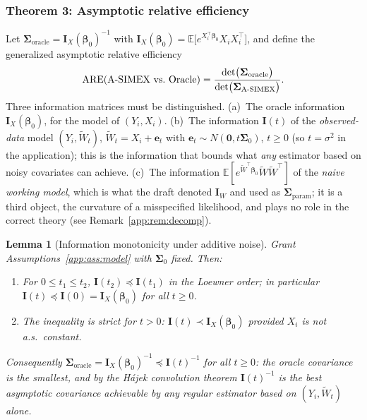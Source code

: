 \documentclass[11pt]{article}
\theoremstyle{plain}
\newtheorem{lemma}{Lemma}
\theoremstyle{definition}
\newcommand{\E}{\mathbb{E}}
\newcommand{\bet}{\bm{\beta}}
\newcommand{\bSig}{\bm{\Sigma}}
\newcommand{\asimex}{\textup{A-SIMEX}}
\begin{document}
\subsubsection{Theorem 3: Asymptotic relative efficiency}\label{app:sec:are}

Let $\bSig_{\mathrm{oracle}}=\bm I_X(\bet_0)^{-1}$ with
$\bm I_X(\bet_0)=\E\bigl[e^{X_i^\top\bet_0}X_iX_i^\top\bigr]$, and define
the generalized asymptotic relative efficiency
\[
  \mathrm{ARE}(\asimex\text{ vs.\ Oracle})
  =\frac{\det\bigl(\bSig_{\mathrm{oracle}}\bigr)}
        {\det\bigl(\bSig_{\asimex}\bigr)} .
\]
Three information matrices must be distinguished. (a)~The oracle
information $\bm I_X(\bet_0)$, for the model of $(Y_i,X_i)$. (b)~The
information $\bm I(t)$ of the \emph{observed-data} model
$(Y_i,\widetilde W_t)$, $\widetilde W_t=X_i+\bm e_t$ with
$\bm e_t\sim N(\bm 0,t\bSig_0)$, $t\ge0$ (so $t=\sigma^2$ in the
application); this is the information that bounds what \emph{any}
estimator based on noisy covariates can achieve. (c)~The information
$\E[e^{\widetilde W^\top\bet_0}\widetilde W\widetilde W^\top]$ of the
\emph{naive working model}, which is what the draft denoted
$\bm I_W$ and used as $\bSig_{\mathrm{param}}$; it is a third object,
the curvature of a misspecified likelihood, and plays no role in the
correct theory (see Remark~\ref{app:rem:decomp}).

\begin{lemma}[Information monotonicity under additive noise]\label{app:lem:info}
Grant Assumptions~\ref{app:ass:model} with $\bSig_0$ fixed. Then:
\begin{enumerate}\itemsep2pt
\item[(i)] For $0\le t_1\le t_2$, $\bm I(t_2)\preceq\bm I(t_1)$ in the
      Loewner order; in particular $\bm I(t)\preceq\bm I(0)=\bm I_X(\bet_0)$
      for all $t\ge0$.
\item[(ii)] The inequality is strict for $t>0$: $\bm I(t)\prec\bm I_X(\bet_0)$
      provided $X_i$ is not a.s.\ constant.
\end{enumerate}
Consequently $\bSig_{\mathrm{oracle}}=\bm I_X(\bet_0)^{-1}
\preceq\bm I(t)^{-1}$ for all $t\ge0$: the oracle covariance is the
smallest, and by the H\'ajek convolution theorem
$\bm I(t)^{-1}$ is the best asymptotic covariance achievable by any
regular estimator based on $(Y_i,\widetilde W_t)$ alone.
\end{lemma}
\end{document}
